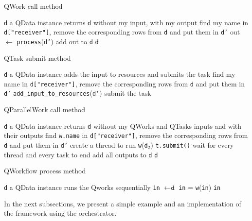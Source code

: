\documentclass[10pt, conference, compsocconf]{IEEEtran}
\begin{document}
\begin{algorithm}
\caption{QWork call method}
\label{alg:Qwork}
\small
\begin{algorithmic}
\REQUIRE \texttt{d} a QData instance
\ENSURE returns \texttt{d} without my input, with my output
\STATE find my name in \texttt{d["receiver"]}, remove the corresponding rows from \texttt{d} and put them in \texttt{d'}
\STATE out $\leftarrow$ \texttt{process}(\texttt{d'})
\STATE add out to \texttt{d}
\RETURN \texttt{d}
\end{algorithmic}
\end{algorithm}
\begin{algorithm}
\caption{QTask submit method}
\label{alg:Qtask}
\small
\begin{algorithmic}
\REQUIRE \texttt{d} a QData instance
\ENSURE adds the input to resources and submits the task
\STATE find my name in \texttt{d["receiver"]}, remove the corresponding rows from \texttt{d} and put them in \texttt{d'}
\STATE \texttt{add\_input\_to\_resources}(\texttt{d'})
\STATE submit the task
\end{algorithmic}
\end{algorithm}
\begin{algorithm}
\caption{QParallelWork call method}
\label{alg:Qparallel}
\small
\begin{algorithmic}
\REQUIRE \texttt{d} a QData instance
\ENSURE returns \texttt{d} without my QWorks and QTasks inputs and with their outputs
\STATE find \texttt{w.name} in \texttt{d["receiver"]}, remove the corresponding rows from \texttt{d} and put them in \texttt{d'}
\ENDFOR
{}
\STATE create a thread to run \texttt{w}(\texttt{d$_2$})
\ENDFOR
{}
\STATE \texttt{t.submit()}
\ENDFOR
\STATE wait for every thread and every task to end
\STATE add all outputs to \texttt{d}
\RETURN \texttt{d}
\end{algorithmic}
\end{algorithm}
\begin{algorithm}
\caption{QWorkflow process method}
\label{alg:Qworkflow}
\small
\begin{algorithmic}
 \REQUIRE \texttt{d} a QData instance
\ENSURE runs the Qworks sequentially
\STATE \texttt{in} $\leftarrow \texttt{d}$
\STATE \texttt{in} = \texttt{w}(\texttt{in})
\ENDFOR
\RETURN \texttt{in}
\end{algorithmic}
\end{algorithm}
In the next subsections, we present a simple example and an implementation of the framework using the orchestrator.
 
\end{document}
